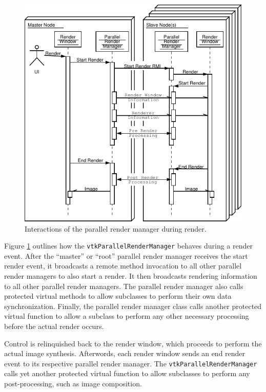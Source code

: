 \documentclass[twocolumn]{article}
\newcommand{\cidentifier}[1]{\texttt{#1}}
\begin{document}
  \begin{figure}
    \begin{center}
      \includegraphics[width=\linewidth]
		      {images/ParallelRenderManagerInteraction}
    \end{center}
    \caption{Interactions of the parallel render manager during render.}
    \label{fig:parallel_render_manager_interaction}
  \end{figure}
  Figure \ref{fig:parallel_render_manager_interaction} outlines how the
  \cidentifier{vtk\-Parallel\-Render\-Manager} behaves during a render
  event.  After the ``master'' or ``root'' parallel render manager receives
  the start render event, it broadcasts a remote method invocation to all
  other parallel render managers to also start a render.  It then
  broadcasts rendering information to all other parallel render managers.
  The parallel render manager also calls protected virtual methods to allow
  subclasses to perform their own data synchronization.  Finally, the
  parallel render manager class calls another protected virtual function to
  allow a subclass to perform any other necessary processing before the
  actual render occurs.

  Control is relinquished back to the render window, which proceeds to
  perform the actual image synthesis.  Afterwords, each render window sends
  an end render event to its respective parallel render manager.  The
  \cidentifier{vtk\-Parallel\-Render\-Manager} calls yet another protected
  virtual function to allow subclasses to perform any post-processing, such
  as image composition.
\end{document}

